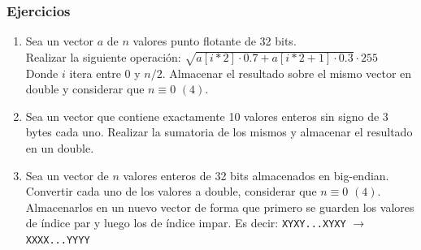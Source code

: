 \documentclass[aspectratio=169]{beamer}
\begin{document}
% 
% 
% 
% 
% 

\begin{frame}[fragile]
	\frametitle{Ejercicios}
	\begin{enumerate}
	 \item Sea un vector $a$ de $n$ valores punto flotante de 32 bits.\\
	 Realizar la siguiente operación: $\sqrt{ a[i*2] \cdot 0.7 + a[i*2+1] \cdot 0.3 } \cdot 255$\\
	 Donde $i$ itera entre $0$ y $n/2$.
	 Almacenar el resultado sobre el mismo vector en double y considerar que $n\equiv0$ $(4)$.
	 \vskip 10pt
	 \item Sea un vector que contiene exactamente 10 valores enteros sin signo de 3 bytes cada uno.
	 Realizar la sumatoria de los mismos y almacenar el resultado en un double.
	 \vskip 10pt
	 \item Sea un vector de $n$ valores enteros de 32 bits almacenados en big-endian.
	 Convertir cada uno de los valores a double, considerar que $n\equiv0$ $(4)$.
	 Almacenarlos en un nuevo vector de forma que primero se guarden los valores de índice par y luego los de índice impar.
	 Es decir: \texttt{XYXY...XYXY} $\rightarrow$ \texttt{XXXX...YYYY}
	\end{enumerate}
\end{frame}
\end{document}
